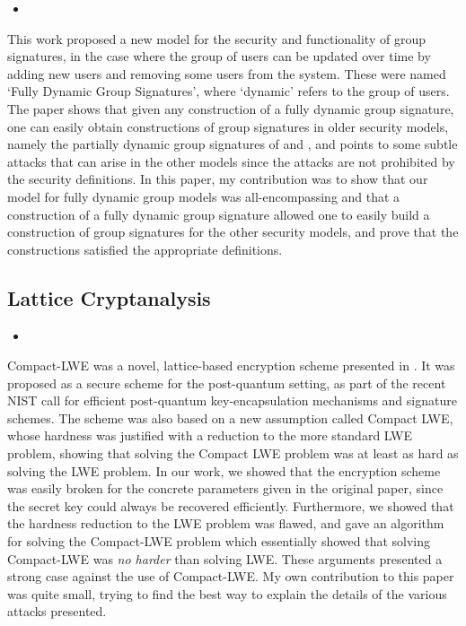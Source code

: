 \begin{itemize}
\item {}
\end{itemize}

This work proposed a new model for the security and functionality of group signatures, in the case where the group of users can be updated over time by adding new users and removing some users from the system. These were named `Fully Dynamic Group Signatures', where `dynamic' refers to the group of users. The paper shows that given any construction of a fully dynamic group signature, one can easily obtain constructions of group signatures in older security models, namely the partially dynamic group signatures of \cite{BellareSZ05} and \cite{KiayiasY06}, and points to some subtle attacks that can arise in the other models since the attacks are not prohibited by the security definitions. In this paper, my contribution was to show that our model for fully dynamic group models was all-encompassing and that a construction of a fully dynamic group signature allowed one to easily build a construction of group signatures for the other security models, and prove that the constructions satisfied the appropriate definitions.

\subsection*{Lattice Cryptanalysis}

\begin{itemize}
\item {}
\end{itemize}

Compact-LWE \cite{LiuLKN17} was a novel, lattice-based encryption scheme presented in \cite{LiuLKN17}. It was proposed as a secure scheme for the post-quantum setting, as part of the recent NIST call for efficient post-quantum key-encapsulation mechanisms and signature schemes. The scheme was also based on a new assumption called Compact LWE, whose hardness was justified with a reduction to the more standard LWE problem, showing that solving the Compact LWE problem was at least as hard as solving the LWE problem. In our work, we showed that the encryption scheme was easily broken for the concrete parameters given in the original paper, since the secret key could always be recovered efficiently. Furthermore, we showed that the hardness reduction to the LWE problem was flawed, and gave an algorithm for solving the Compact-LWE problem which essentially showed that solving Compact-LWE was \emph{no harder} than solving LWE. These arguments presented a strong case against the use of Compact-LWE. My own contribution to this paper was quite small, trying to find the best way to explain the details of the various attacks presented.

